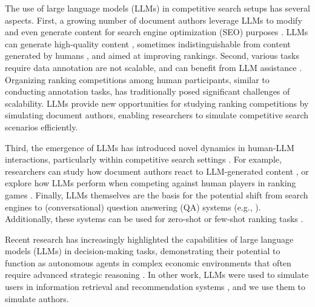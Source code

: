 The use of large language models (LLMs) in competitive search setups has several aspects. First, a growing number of document authors leverage LLMs to modify and even generate content for search engine optimization (SEO) purposes \cite{Memon2024-re, Aggarwal2023-aw, nachimovsky_ranking-incentivized_2024, wu_survey_2024}. LLMs can generate high-quality content \cite{nachimovsky_ranking-incentivized_2024}, sometimes indistinguishable from content generated by humans \cite{wu_survey_2024}, and aimed at improving rankings. Second, various tasks require data annotation are not scalable, and can benefit from LLM assistance \cite{tan_large_2024, faggioli_perspectives_2023}. Organizing ranking competitions among human participants, similar to conducting annotation tasks, has traditionally posed significant challenges of scalability. LLMs provide new opportunities for studying ranking competitions by simulating document authors, enabling researchers to simulate competitive search scenarios efficiently.

Third, the emergence of LLMs has introduced novel dynamics in human-LLM interactions, particularly within competitive search settings \cite{nachimovsky_ranking-incentivized_2024, bardas_prompt-based_2025}. For example, researchers can study how document authors react to LLM-generated content \cite{nachimovsky_ranking-incentivized_2024}, or explore how LLMs perform when competing against human players in ranking games \cite{bardas_prompt-based_2025}. Finally, LLMs themselves are the basis for the potential shift from search engines to (conversational) question answering (QA) systems (e.g., \cite{perplexity}). Additionally, these systems can be used for zero-shot or few-shot ranking tasks \cite{Hou2024-tm, Qin2023-hg, bardas_prompt-based_2025}.



 Recent research has increasingly highlighted the capabilities of large language models (LLMs) in decision-making tasks, demonstrating their potential to function as autonomous agents in complex economic environments that often require advanced strategic reasoning \cite{horton_large_2023, wang_text_2024, zhu_capturing_2024, li_stride_2024, shapira_glee_2024, noauthor_letta_nodate}. In other work, LLMs were used to simulate users in information retrieval and recommendation systems \cite{breuer_report_2024, zhang_generative_2024, wang_user_2024}, and we use them to simulate authors.

